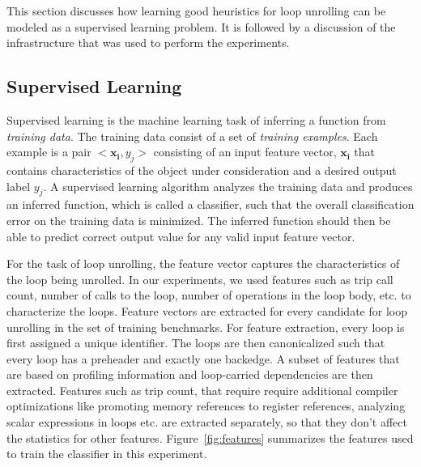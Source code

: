 \documentclass[]{sig-alternate}
\begin{document}
This section discusses how learning good heuristics for loop unrolling can be modeled as a supervised learning problem. It is followed by a discussion of the infrastructure that was used to perform the experiments. 

\subsection{Supervised Learning}
\label{subsec:SupervisedLearning}
Supervised learning is the machine learning task of inferring a function from \emph{training data}. The training data consist of a set of \emph{training examples}. Each example is a pair  $<\mathbf{x_i}, y_j>$ consisting of an input feature vector, $\mathbf{x_i}$ that contains characteristics of the object under consideration and a desired output label $y_j$. A supervised learning algorithm analyzes the training data and produces an inferred function, which is called a classifier, such that the overall classification error on the training data is minimized. The inferred function should then be able to predict correct output value for any valid input feature vector. 

For the task of loop unrolling, the feature vector captures the characteristics of the loop being unrolled. In our experiments, we used features such as trip call count, number of calls to the loop, number of operations in the loop body, etc. to characterize the loops. Feature vectors are extracted for every candidate for loop unrolling in the set of training benchmarks. For feature extraction, every loop is first assigned a unique identifier. The loops are then canonicalized such that every loop has a preheader and exactly one backedge. A subset of features that are based on profiling information and loop-carried dependencies are then extracted. Features such as trip count, that require require additional compiler optimizations like promoting memory references to register references, analyzing scalar expressions in loops etc. are extracted separately, so that they don't affect the statistics for other features. Figure~\ref{fig:features} summarizes the features used to train the classifier in this experiment.
\end{document}
